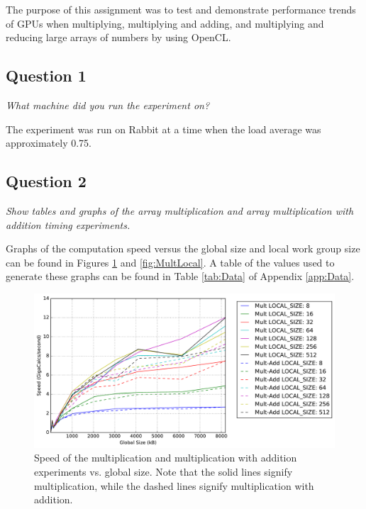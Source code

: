\documentclass{article}
\begin{document}
The purpose of this assignment was to test and demonstrate performance trends of GPUs when multiplying, multiplying and adding, and multiplying and reducing large arrays of numbers by using OpenCL.

\subsection*{Question 1}
\textit{What machine did you run the experiment on?}

The experiment was run on Rabbit at a time when the load average was approximately 0.75.

\subsection*{Question 2}
\textit{Show tables and graphs of the array multiplication and array multiplication with addition timing experiments.}

Graphs of the computation speed versus the global size and local work group size can be found in Figures \ref{fig:MultGlobal} and \ref{fig:MultLocal}.  A table of the values used to generate these graphs can be found in Table \ref{tab:Data} of Appendix \ref{app:Data}.

\begin{figure}[h]
	\centering
        \includegraphics[width=0.7\linewidth]{Mult_Arraysize.pdf}
        \caption{Speed of the multiplication and multiplication with addition experiments vs. global size.  Note that the solid lines signify multiplication, while the dashed lines signify multiplication with addition.}
        \label{fig:MultGlobal}
\end{figure}
\end{document}
